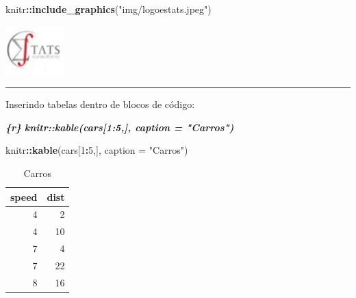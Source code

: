 \documentclass[
]{book}
\newenvironment{Shaded}{\begin{snugshade}}{\end{snugshade}}
\newcommand{\DataTypeTok}[1]{\textcolor[rgb]{0.13,0.29,0.53}{#1}}
\newcommand{\DecValTok}[1]{\textcolor[rgb]{0.00,0.00,0.81}{#1}}
\newcommand{\InformationTok}[1]{\textcolor[rgb]{0.56,0.35,0.01}{\textbf{\textit{#1}}}}
\newcommand{\KeywordTok}[1]{\textcolor[rgb]{0.13,0.29,0.53}{\textbf{#1}}}
\newcommand{\NormalTok}[1]{#1}
\newcommand{\OperatorTok}[1]{\textcolor[rgb]{0.81,0.36,0.00}{\textbf{#1}}}
\newcommand{\StringTok}[1]{\textcolor[rgb]{0.31,0.60,0.02}{#1}}
\begin{document}
\begin{Shaded}
\begin{Highlighting}[]
\NormalTok{knitr}\OperatorTok{::}\KeywordTok{include\_graphics}\NormalTok{(}\StringTok{"img/logoestats.jpeg"}\NormalTok{)}
\end{Highlighting}
\end{Shaded}

\includegraphics[width=0.89in]{img/logoestats}

\begin{center}\rule{0.5\linewidth}{0.5pt}\end{center}

Inserindo tabelas dentro de blocos de código:

\begin{Shaded}
\begin{Highlighting}[]
\InformationTok{\textasciigrave{}\textasciigrave{}\textasciigrave{}\{r\}}
\InformationTok{knitr::kable(cars[1:5,], caption = "Carros")}
\InformationTok{\textasciigrave{}\textasciigrave{}\textasciigrave{}}
\end{Highlighting}
\end{Shaded}

\begin{Shaded}
\begin{Highlighting}[]
\NormalTok{knitr}\OperatorTok{::}\KeywordTok{kable}\NormalTok{(cars[}\DecValTok{1}\OperatorTok{:}\DecValTok{5}\NormalTok{,], }\DataTypeTok{caption =} \StringTok{"Carros"}\NormalTok{)}
\end{Highlighting}
\end{Shaded}

\begin{table}

\caption{\label{tab:unnamed-chunk-28}Carros}
\centering
\begin{tabular}[t]{r|r}
\hline
speed & dist\\
\hline
4 & 2\\
\hline
4 & 10\\
\hline
7 & 4\\
\hline
7 & 22\\
\hline
8 & 16\\
\hline
\end{tabular}
\end{table}
\end{document}
